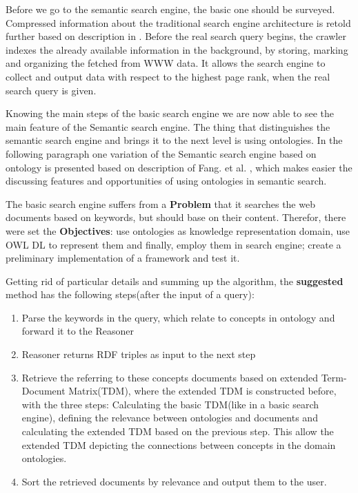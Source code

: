		Before we go to the semantic search engine, the basic one should be surveyed. Compressed information about the traditional search engine architecture is retold further based on description in \cite{Gup12}. Before the real search query begins, the crawler indexes the already available information in the background, by  storing, marking and organizing the fetched from WWW data. It allows the search engine to collect and output data with respect to the highest page rank, when the real search query is given.
		
		Knowing the main steps of the basic search engine we are now able to see the main feature of the Semantic search engine. The thing that distinguishes the semantic search engine and brings it to the next level is using ontologies. In the following paragraph one variation of the Semantic search engine based on ontology is presented based on description of Fang. et al. \cite{Fang05}, which makes easier the discussing features and opportunities of using ontologies in semantic search.
		        
		The basic search engine suffers from a \textbf{Problem} that it searches the web documents based on keywords, but should base on their content. Therefor, there were set the \textbf{Objectives}: use ontologies as knowledge representation domain, use OWL DL to represent them and finally, employ them in search engine; create a preliminary implementation of a framework and test it. 
		
		Getting rid of particular details and summing up the algorithm, the \textbf{suggested} method has the following steps(after the input of a query):
			\begin{enumerate}
				\item Parse the keywords in the query, which relate to concepts in ontology and forward it to the Reasoner
				\item Reasoner returns RDF triples as input to the next step
				\item Retrieve the referring to these concepts documents based on extended Term-Document Matrix(TDM), where the extended TDM is constructed before, with the three steps: Calculating the basic TDM(like in a basic search engine), defining the relevance between ontologies and documents and calculating the extended TDM based on the previous step. This allow the extended TDM depicting the connections between concepts in the domain ontologies.
				\item Sort the retrieved documents by relevance and output them to the user.   
			\end{enumerate}
		
